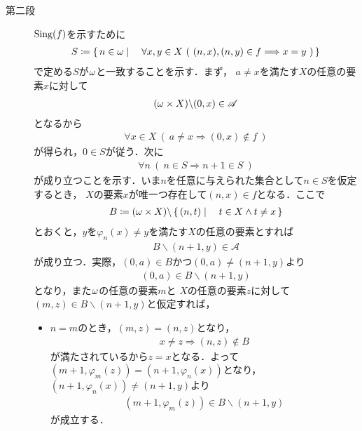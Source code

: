 \begin{prf}
\begin{description}
			\item[第二段]
				$\operatorname*{Sing}(f)$を示すために
				\begin{align}
					S \coloneqq \Set{n \in \omg}{\forall x,y \in X\ 
					(\ (n,x),(n,y) \in f \Longrightarrow x = y\ )}
				\end{align}
				で定める$S$が${\bf \omega}$と一致することを示す．まず，
				$a \neq x$を満たす$X$の任意の要素$x$に対して
				\begin{align}
					({\bf \omega} \times X) \backslash (0,x) \in \mathscr{A}
				\end{align}
				となるから
				\begin{align}
					\forall x \in X\ (\ a \neq x \Longrightarrow (0,x) \notin f\ )
				\end{align}
				が得られ，$0 \in S$が従う．次に
				\begin{align}
					\forall n\ \left(\ n \in S \Longrightarrow n+1 \in S\ \right)
				\end{align}
				が成り立つことを示す．いま$n$を任意に与えられた集合として$n \in S$を仮定するとき，
				$X$の要素$x$が唯一つ存在して$(n,x) \in f$となる．ここで
				\begin{align}
					B \coloneqq ({\bf \omega} \times X) \backslash 
					\left\{\, (n,t) \mid \quad t \in X \wedge t \neq x\, \right\}
				\end{align}
				とおくと，$y$を$\varphi_n(x) \neq y$を満たす$X$の任意の要素とすれば
				\begin{align}
					B \backslash (n+1,y) \in \mathscr{A}
				\end{align}
				が成り立つ．実際，$(0,a) \in B$かつ$(0,a) \neq (n+1,y)$より
				\begin{align}
					(0,a) \in B \backslash (n+1,y)
				\end{align}
				となり，また${\bf \omega}$の任意の要素$m$と
				$X$の任意の要素$z$に対して$(m,z) \in B \backslash (n+1,y)$と仮定すれば，
				\begin{itemize}
					\item $n=m$のとき，$(m,z) = (n,z)$となり，
						\begin{align}
							x \neq z \Longrightarrow (n,z) \notin B
						\end{align}
						が満たされているから$z = x$となる．よって$(m+1,\varphi_m(z))
						= (n+1,\varphi_n(x))$となり，$(n+1,\varphi_n(x)) \neq 
						(n+1,y)$より
						\begin{align}
							(m+1,\varphi_m(z)) \in B \backslash (n+1,y)
						\end{align}
						が成立する．
						

\end{itemize}
\end{description}
\end{prf}
